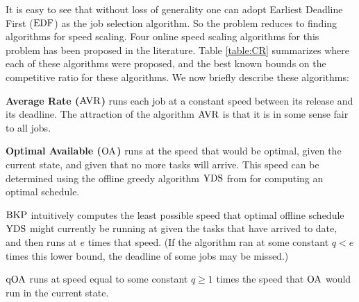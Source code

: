 \documentclass[11pt]{article}
\newcommand{\YDS}{{\rm YDS}}
\newcommand{\BKP}{{\rm BKP}}
\newcommand{\EDF}{{\rm EDF}}
\newcommand{\AVR}{{\rm AVR}}
\newcommand{\OA}{{\rm OA}}
\newcommand{\qOA}{{\rm qOA}}
\begin{document}
It is easy to see that without loss of generality one can adopt Earliest Deadline First ($\EDF$)
as the job selection algorithm. So the problem reduces to finding algorithms for speed scaling.
Four online speed scaling algorithms for this problem has been proposed in the literature.
Table \ref{table:CR} summarizes where each of these algorithms were proposed, and the
best known bounds on the competitive ratio for these algorithms. We now briefly describe
these algorithms:

\smallskip
\noindent
{\bf Average Rate (\boldmath$\AVR$\unboldmath)}
runs each job at a constant speed between its release and its deadline.
The attraction of the algorithm $\AVR$ is that it is in some sense fair
to all jobs.

\smallskip
\noindent
{\bf Optimal Available (\boldmath$\OA$\unboldmath)}
runs at the speed that would be optimal, given the current state, and given that no more tasks will arrive.
This speed can be determined using the offline greedy 
algorithm $\YDS$ from \cite{YDS} for computing an optimal schedule.

\smallskip
\noindent
{\bf \boldmath$\BKP$\unboldmath} 
intuitively computes the least possible speed
that optimal offline schedule $\YDS$ might currently be running at given the
tasks that have arrived to date, and 
then runs at $e$ times that speed. (If the algorithm ran at some constant $q< e$ times this lower bound,
the deadline of some jobs may be missed.)

\smallskip
\noindent
{\bf \boldmath$\qOA$\unboldmath}
runs at
speed equal to some constant $q\ge1$ times the speed that $\OA$
would run in the current state.

\smallskip
\end{document}
